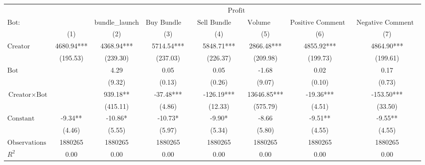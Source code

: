\begin{tabular}{lccccccc}
\hline
 & \multicolumn{7}{c}{$\text{Profit}$} \\
 $\text{Bot}:$ &  & bundle_launch & $\text{Buy Bundle Bot}$ & $\text{Sell Bundle Bot}$ & $\text{Volume Bot}$ & $\text{Positive Comment Bot}$ & $\text{Negative Comment Bot}$ \\
 & (1) & (2) & (3) & (4) & (5) & (6) & (7)\\
\hline
$\text{Creator}$ & 4680.94*** & 4368.94*** & 5714.54*** & 5848.71*** & 2866.48*** & 4855.92*** & 4864.90*** \\
 & (195.53) & (239.30) & (237.03) & (226.37) & (209.98) & (199.73) & (199.61) \\
$\text{Bot}$ &  & 4.29 & 0.05 & 0.05 & -1.68 & 0.02 & 0.17 \\
 &  & (9.32) & (0.13) & (0.26) & (9.07) & (0.10) & (0.73) \\
$\text{Creator} \times \text{Bot}$ &  & 939.18** & -37.48*** & -126.19*** & 13646.85*** & -19.36*** & -153.50*** \\
 &  & (415.11) & (4.86) & (12.33) & (575.79) & (4.51) & (33.50) \\
$\text{Constant}$ & -9.34** & -10.86* & -10.73* & -9.90* & -8.66 & -9.51** & -9.55** \\
 & (4.46) & (5.55) & (5.97) & (5.34) & (5.80) & (4.55) & (4.55) \\
$\text{Observations}$ & 1880265 & 1880265 & 1880265 & 1880265 & 1880265 & 1880265 & 1880265 \\
$R^2$ & 0.00 & 0.00 & 0.00 & 0.00 & 0.00 & 0.00 & 0.00 \\
\hline
\end{tabular}